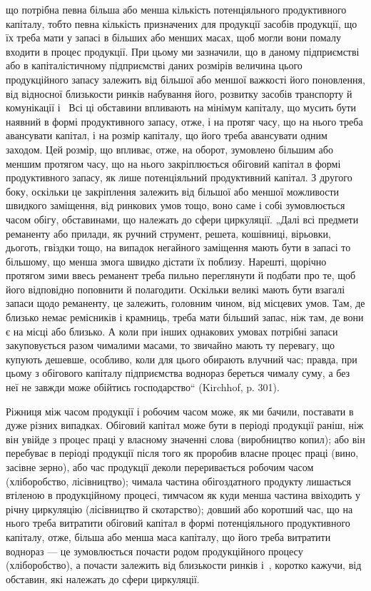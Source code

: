 \parcont{}  %
що потрібна певна більша або менша кількість потенціяльного продуктивного капіталу, тобто певна
кількість призначених для продукції засобів продукції, що їх треба мати у запасі в більших або
менших масах, щоб могли вони помалу входити в процес продукції. При цьому ми зазначили, що в даному
підприємстві або в капіталістичному підприємстві даних розмірів величина цього продукційного запасу
залежить від більшої або меншої важкості його поновлення, від відносної близькости ринків набування
його, розвитку засобів транспорту й комунікації і~ Всі ці обставини впливають на мінімум
капіталу, що мусить бути наявний в формі продуктивного запасу, отже, і на протяг часу, що на нього
треба авансувати капітал, і на розмір капіталу, що його треба авансувати одним заходом. Цей розмір,
що впливає, отже, на оборот, зумовлено більшим або меншим протягом часу, що на нього закріплюється
обіговий капітал в формі продуктивного запасу, як лише потенціяльний продуктивний капітал. З другого
боку, оскільки це закріплення залежить від більшої або меншої можливости швидкого заміщення, від
ринкових умов тощо, воно саме і собі зумовлюється часом обігу, обставинами, що належать до сфери
циркуляції. „Далі всі предмети реманенту або прилади, як ручний струмент, решета, кошівниці,
вірьовки, дьоготь, гвіздки тощо, на випадок негайного заміщення мають бути в запасі то більшому, що
менша змога швидко дістати їх поблизу. Нарешті, щорічно протягом зими ввесь реманент треба пильно
переглянути й подбати про те, щоб його відповідно поповнити й полагодити. Оскільки великі мають бути
взагалі запаси щодо реманенту, це залежить, головним чином, від місцевих умов. Там, де близько немає
ремісників і крамниць, треба мати більший запас, ніж там, де вони є на місці або близько. А коли при
інших однакових умовах потрібні запаси закуповується разом чималими масами, то звичайно мають ту
перевагу, що купують дешевше, особливо, коли для цього обирають влучний час; правда, при цьому з
обігового капіталу підприємства воднораз береться чималу суму, а без неї не завжди може обійтись
господарство“ (Kirchhof, p. 301).

Ріжниця між часом продукції і робочим часом може, як ми бачили, поставати в дуже різних випадках.
Обіговий капітал може бути в періоді продукції раніш, ніж він увійде з процес праці у власному
значенні слова (виробництво копил); або він перебуває в періоді продукції після того як проробив
власне процес праці (вино, засівне зерно), або час продукції деколи переривається робочим часом
(хліборобство, лісівництво); чимала частина обігоздатного продукту лишається втіленою в
продукційному процесі, тимчасом як куди менша частина ввіходить у річну циркуляцію (лісівництво й
скотарство); довший або коротший час, що на нього треба витратити обіговий капітал в формі
потенціяльного продуктивного капіталу, отже, більша або менша маса капіталу, що його треба витратити
воднораз — це зумовлюється почасти родом продукційного процесу (хліборобство), а почасти залежить
від близькости ринків і~, коротко кажучи, від обставин, які належать до сфери циркуляції.

